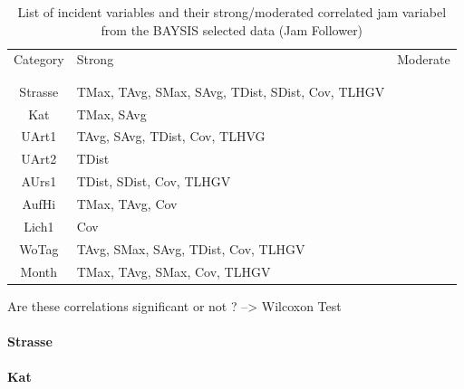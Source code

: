 \documentclass[a4paper,headsepline,footsepline,fontsize=11pt,BCOR=12mm,DIV=12]{report}
\begin{document}
\noindent
\begin{table}[h!]
	\centering
	\begin{tabular}{c|l|l}  
		Category & Strong & Moderate \\
		\\[-1em]
		\hline
		\\[-1em]
		Strasse & TMax, TAvg, SMax, SAvg, TDist, SDist, Cov, TLHGV & \\ 
 		Kat & TMax, SAvg & \\ 
 		UArt1 & TAvg, SAvg, TDist, Cov, TLHVG & \\
 		UArt2 & TDist & \\
 		AUrs1 & TDist, SDist, Cov, TLHGV & \\
 		AufHi & TMax, TAvg, Cov & \\
 		Lich1 & Cov & \\
 		WoTag & TAvg, SMax, SAvg, TDist, Cov, TLHGV & \\
 		Month & TMax, TAvg, SMax, Cov, TLHGV & \\
	\end{tabular}
	\caption{List of incident variables and their strong/moderated correlated jam variabel from the BAYSIS selected data (Jam Follower)}
\end{table}

Are these correlations significant or not ? --> Wilcoxon Test

\paragraph{Strasse}

\paragraph{Kat}
\end{document}
